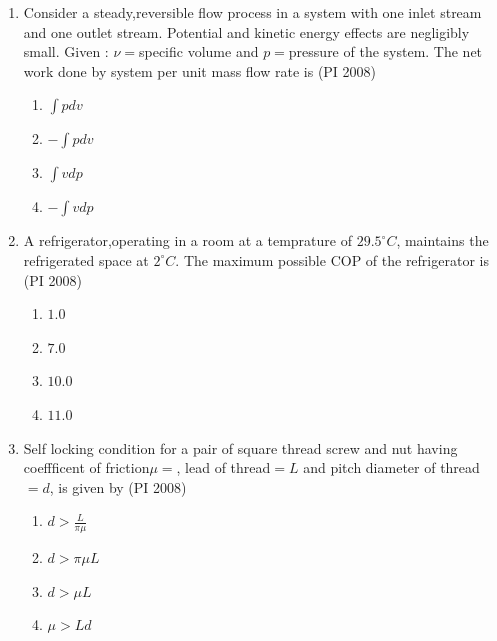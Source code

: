 \documentclass[journal,12pt,onecolumn]{IEEEtran}
\theoremstyle{remark}
\begin{document}
\begin{enumerate}
\begin{multicols}{4}
\begin{enumerate}
        \item $1-\frac{\alpha}{2}$
        \item $2\alpha$
    \end{enumerate}
\end{multicols}
\vspace{1cm}
\item %
Consider a steady,reversible flow process in a system with one inlet stream and one outlet stream. Potential and kinetic energy effects are negligibly small. Given : $\nu=$specific volume and $p=$pressure of the system. The net work done by system per unit mass flow rate is 
    \hfill{(PI 2008)}
    \begin{multicols}{4}
    \begin{enumerate}
        \item $\int pdv$
        \item $-\int pdv$
        \item $\int vdp$
        \item $-\int vdp$
    \end{enumerate}
\end{multicols}
\vspace{1cm}
\item %
A refrigerator,operating in a room at a temprature of $29.5^{\circ}C$, maintains the refrigerated space at $2^{\circ}C$. The maximum possible COP of the refrigerator is 
    \hfill{(PI 2008)}
    \begin{multicols}{4}
    \begin{enumerate}
        \item $1.0$
        \item $7.0$
        \item $10.0$
        \item $11.0$
    \end{enumerate}
\end{multicols}
\vspace{1cm}
\item %
Self locking condition for a pair of square thread screw and nut having coeffficent of friction$\mu=$, lead of thread$=L$ and pitch diameter of thread $=d$, is given by
    \hfill{(PI 2008)}
    \begin{multicols}{4}
    \begin{enumerate}
        \item $d>\frac{L}{\pi\mu}$
        \item $d>\pi\mu L$
        \item $d>\mu L$
        \item $\mu>Ld$

\end{enumerate}
\end{multicols}
\end{enumerate}
\end{document}

